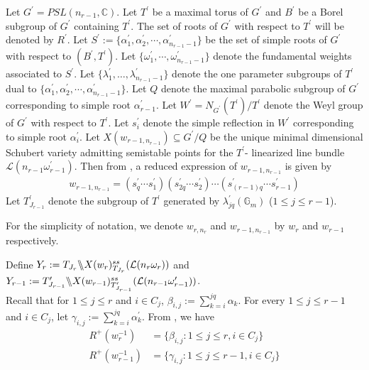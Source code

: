 \documentclass[12pt,reqno]{amsart}
\numberwithin{equation}{section}
\theoremstyle{definition}
\newcommand{\GmodX}[3]{#1 \backslash\mkern-6mu\backslash #2^{ss}_{#1}(#3)}
\begin{document}
Let $G^{\prime}=PSL(n_{r-1},\mathbb{C})$. Let $T^{\prime}$ be a maximal torus of $G^{\prime}$ and $B^{\prime}$ be a Borel subgroup of $G^{\prime}$ containing $T^{\prime}$. The set of roots of $G^{\prime}$ with respect to $T^{\prime}$ will be denoted by $R^{\prime}$. Let $S^{\prime}:=\{\alpha_{1}^{\prime},\alpha_{2}^{\prime},\cdots,\alpha_{n_{r-1}-1}^{\prime}\}$ be the set of simple roots of $G^{\prime}$ with respect to $(B^{\prime},T^{\prime})$. Let $\{\omega^{\prime}_{1},\cdots,\omega^{\prime}_{n_{r-1}-1}\}$ denote the fundamental weights associated to $S^{\prime}$. Let $\{\lambda_{1}^{\prime},\ldots,\lambda_{n_{r-1}-1}^{\prime}\}$ denote the one parameter subgroups of $T^{\prime}$ dual to $\{\alpha_{1}^{\prime},\alpha_{2}^{\prime},\cdots,\alpha_{n_{r-1}-1}^{\prime}\}$. Let $Q$ denote the maximal parabolic subgroup of $G^{\prime}$ corresponding to simple root $\alpha_{r-1}^{\prime}$. Let $W^{\prime}=N_{G^{\prime}}(T^{\prime})/T^{\prime}$ denote the Weyl group of $G^{\prime}$ with respect to $T^{\prime}$. Let $s^{\prime}_{i}$ denote the simple reflection in $W^{\prime}$ corresponding to simple root $\alpha^{\prime}_{i}$. Let $X(w_{r-1,n_{r-1}})\subseteq G^{\prime}/Q$ be the unique minimal dimensional Schubert variety admitting semistable points for the $T^{\prime}$- linearized line bundle $\mathcal{L}(n_{r-1}\omega^{\prime}_{r-1})$. Then from \cite[Lemma 2.7]{sskannan}, a reduced expression of $w_{r-1,n_{r-1}}$ is given by
\begin{align}\label{eq 5.1.2}
	w_{r-1,n_{r-1}}=(s^{\prime}_{q}\cdots s^{\prime}_{1})(s^{\prime}_{2q}\cdots s^{\prime}_{2})\cdots (s^{\prime}_{(r-1)q}\cdots s^{\prime}_{r-1})
\end{align}
Let $T^{\prime}_{J_{r-1}}$ denote the subgroup of $T^{\prime}$ generated by $\lambda_{jq}^{\prime}(\mathbb{G}_{m})$ ($1\leq j\leq r-1$). 

For the simplicity of notation, we denote $w_{r,n_{r}}$ and $w_{r-1,n_{r-1}}$ by $w_{r}$ and $w_{r-1}$ respectively.

Define $Y_{r}:=\GmodX{T_{J_{r}}}{X(w_{r})}{\mathcal{L}(n_{r}\omega_{r})}$ and $Y_{r-1}:=\GmodX{T^{\prime}_{J_{r-1}}}{X(w_{r-1})}{\mathcal{L}(n_{r-1}\omega_{r-1}^{\prime})}$.\\
Recall that for $1\leq j\leq r$ and $i\in C_{j}$, $\beta_{i,j}:=\sum_{k=i}^{jq}\alpha_{k}$.
For every $1\leq j\leq r-1$ and  $i\in C_{j}$, let $\gamma_{i,j}:=\sum_{k=i}^{jq}\alpha^{\prime}_{k}$.
From \cite[Lemma 2.4]{sskannan}, we have \begin{align}
	R^{+}(w_{r}^{-1})&=\{\beta_{i,j}:1\leq j\leq r,i\in C_{j}\}\label{eq 5.1.3}\\
	R^{+}(w_{r-1}^{-1})&=\{\gamma_{i,j}:1\leq j\leq r-1, i\in C_{j}\}\label{eq 5.1.4}
\end{align}
\end{document}

